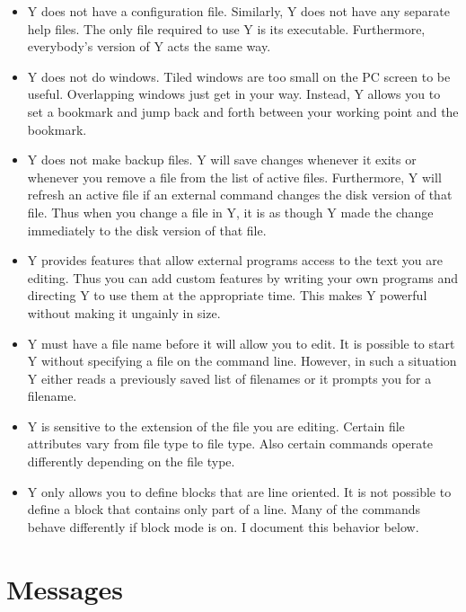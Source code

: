 \begin{itemize}

\item Y does not have a configuration file. Similarly, Y does not have any separate help files.
  The only file required to use Y is its executable. Furthermore, everybody's version of Y acts
  the same way.

\item Y does not do windows. Tiled windows are too small on the PC screen to be useful.
  Overlapping windows just get in your way. Instead, Y allows you to set a bookmark and jump
  back and forth between your working point and the bookmark.

\item Y does not make backup files. Y will save changes whenever it exits or whenever you remove
  a file from the list of active files. Furthermore, Y will refresh an active file if an
  external command changes the disk version of that file. Thus when you change a file in Y, it
  is as though Y made the change immediately to the disk version of that file.

\item Y provides features that allow external programs access to the text you are editing. Thus
  you can add custom features by writing your own programs and directing Y to use them at the
  appropriate time. This makes Y powerful without making it ungainly in size.

\item Y must have a file name before it will allow you to edit. It is possible to start Y
  without specifying a file on the command line. However, in such a situation Y either reads a
  previously saved list of filenames or it prompts you for a filename.

\item Y is sensitive to the extension of the file you are editing. Certain file attributes vary
  from file type to file type. Also certain commands operate differently depending on the file
  type.

\item Y only allows you to define blocks that are line oriented. It is not possible to define a
  block that contains only part of a line. Many of the commands behave differently if block mode
  is on. I document this behavior below.

\end{itemize}

\section{Messages}

